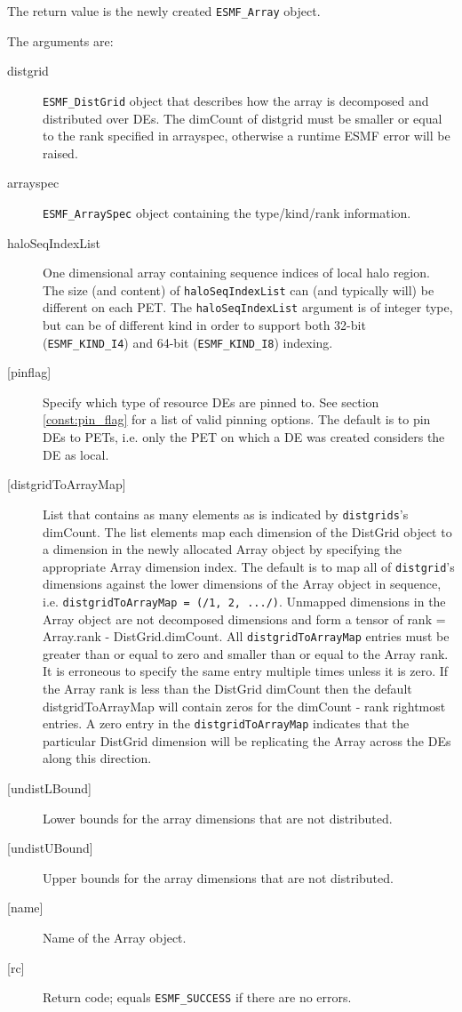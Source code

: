    The return value is the newly created {\tt ESMF\_Array} object.
  
   The arguments are:
   \begin{description}
   \item[distgrid]
   {\tt ESMF\_DistGrid} object that describes how the array is decomposed and
   distributed over DEs. The dimCount of distgrid must be smaller or equal
   to the rank specified in arrayspec, otherwise a runtime ESMF error will be
   raised.
   \item[arrayspec]
   {\tt ESMF\_ArraySpec} object containing the type/kind/rank information.
   \item[haloSeqIndexList]
   One dimensional array containing sequence indices of local halo region.
   The size (and content) of {\tt haloSeqIndexList} can (and typically will)
   be different on each PET.
   The {\tt haloSeqIndexList} argument is of integer type, but can be of
   different kind in order to support both 32-bit ({\tt ESMF\_KIND\_I4})
   and 64-bit ({\tt ESMF\_KIND\_I8}) indexing.
   \item[{[pinflag]}]
   Specify which type of resource DEs are pinned to. See section
   \ref{const:pin_flag} for a list of valid pinning options.
   The default is to pin DEs to PETs, i.e. only the PET on which a DE
   was created considers the DE as local.
   \item[{[distgridToArrayMap]}]
   List that contains as many elements as is indicated by
   {\tt distgrids}'s dimCount. The list elements map each dimension of
   the DistGrid object to a dimension in the newly allocated Array object
   by specifying the appropriate Array dimension index. The default is
   to map all of {\tt distgrid}'s dimensions against the lower dimensions
   of the Array object in sequence, i.e. {\tt distgridToArrayMap =
   (/1, 2, .../)}.
   Unmapped dimensions in the Array object are not decomposed dimensions
   and form a tensor of rank = Array.rank - DistGrid.dimCount.
   All {\tt distgridToArrayMap} entries must be greater than or equal
   to zero and smaller than or equal to the Array rank. It is erroneous
   to specify the same entry multiple times unless it is zero.
   If the Array rank is less than the DistGrid dimCount then the default
   distgridToArrayMap will contain zeros for the dimCount - rank
   rightmost entries. A zero entry in the {\tt distgridToArrayMap}
   indicates that the particular DistGrid dimension will be replicating
   the Array across the DEs along this direction.
   \item[{[undistLBound]}]
   Lower bounds for the array dimensions that are not distributed.
   \item[{[undistUBound]}]
   Upper bounds for the array dimensions that are not distributed.
   \item[{[name]}]
   Name of the Array object.
   \item[{[rc]}]
   Return code; equals {\tt ESMF\_SUCCESS} if there are no errors.
   \end{description}
   
